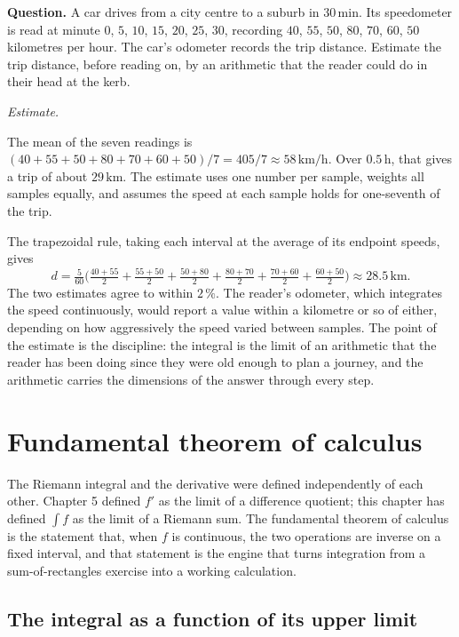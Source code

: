 \begin{estimation}
\textbf{Question.} A car drives from a city centre to a suburb in
$30 \,\si{\minute}$. Its speedometer is read at minute $0$, $5$,
$10$, $15$, $20$, $25$, $30$, recording $40$, $55$, $50$, $80$,
$70$, $60$, $50$ kilometres per hour. The car's odometer records the
trip distance. Estimate the trip distance, before reading on, by an
arithmetic that the reader could do in their head at the kerb.

\smallskip
\textit{Estimate.}

\smallskip
The mean of the seven readings is
$(40+55+50+80+70+60+50)/7 = 405/7 \approx 58 \,\si{\kilo\meter\per\hour}$.
Over $0.5\,\si{\hour}$, that gives a trip of about
$29 \,\si{\kilo\meter}$. The estimate uses one number per sample,
weights all samples equally, and assumes the speed at each sample
holds for one-seventh of the trip.

The trapezoidal rule, taking each interval at the average of its
endpoint speeds, gives
\[
d = \tfrac{5}{60}\bigl(\tfrac{40+55}{2} + \tfrac{55+50}{2} +
\tfrac{50+80}{2} + \tfrac{80+70}{2} + \tfrac{70+60}{2} +
\tfrac{60+50}{2}\bigr)
\approx 28.5\,\si{\kilo\meter}.
\]
The two estimates agree to within $2\,\%$. The reader's odometer,
which integrates the speed continuously, would report a value
within a kilometre or so of either, depending on how aggressively
the speed varied between samples. The point of the estimate is the
discipline: the integral is the limit of an arithmetic that the
reader has been doing since they were old enough to plan a journey,
and the arithmetic carries the dimensions of the answer through
every step.
\end{estimation}

\section{Fundamental theorem of calculus}

The Riemann integral and the derivative were defined independently of
each other. Chapter 5 defined $f'$ as the limit of a difference
quotient; this chapter has defined $\int f$ as the limit of a Riemann
sum. The fundamental theorem of calculus is the statement that, when
$f$ is continuous, the two operations are inverse on a fixed
interval, and that statement is the engine that turns integration
from a sum-of-rectangles exercise into a working calculation.

\subsection{The integral as a function of its upper limit}

